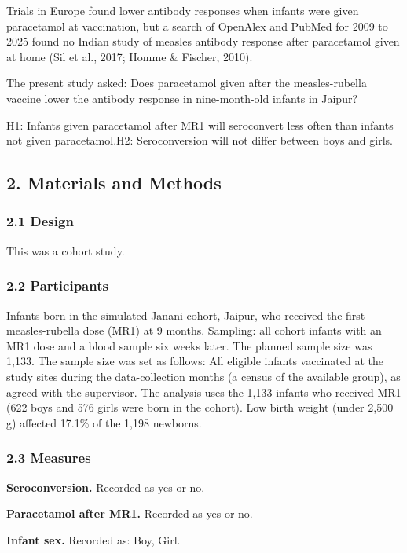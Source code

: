 \documentclass[12pt]{article}
\begin{document}
Trials in Europe found lower antibody responses when infants were given paracetamol at vaccination, but a search of OpenAlex and PubMed for 2009 to 2025 found no Indian study of measles antibody response after paracetamol given at home (Sil et al., 2017; Homme \& Fischer, 2010).

The present study asked: Does paracetamol given after the measles-rubella vaccine lower the antibody response in nine-month-old infants in Jaipur?

H1: Infants given paracetamol after MR1 will seroconvert less often than infants not given paracetamol.\newline{}H2: Seroconversion will not differ between boys and girls.

\subsection{2. Materials and Methods}

\subsubsection{2.1 Design}

This was a cohort study.

\subsubsection{2.2 Participants}

Infants born in the simulated Janani cohort, Jaipur, who received the first measles-rubella dose (MR1) at 9 months. Sampling: all cohort infants with an MR1 dose and a blood sample six weeks later. The planned sample size was 1,133. The sample size was set as follows: All eligible infants vaccinated at the study sites during the data-collection months (a census of the available group), as agreed with the supervisor. The analysis uses the 1,133 infants who received MR1 (622 boys and 576 girls were born in the cohort). Low birth weight (under 2,500 g) affected 17.1\% of the 1,198 newborns.

\subsubsection{2.3 Measures}

\textbf{Seroconversion.} Recorded as yes or no.

\textbf{Paracetamol after MR1.} Recorded as yes or no.

\textbf{Infant sex.} Recorded as: Boy, Girl.
\end{document}
